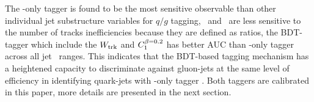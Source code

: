 
The \ntrk-only tagger is found to be the most sensitive observable than other individual jet substructure variables for $q/g$ tagging, 
\wtrk~and \cbeta~are less sensitive to the number of tracks inefficiencies because they are defined as ratios, the BDT-tagger which include the $W_{\mathrm{trk}}$ and $C_{1}^{\beta=0.2}$ has better AUC than \ntrk-only tagger across all jet \pt~ranges. This indicates that the BDT-based tagging mechanism has a heightened capacity to discriminate against gluon-jets at the same level of efficiency in identifying quark-jets with \ntrk-only tagger . Both taggers are calibrated in this paper, more details are presented in the next section.



\FloatBarrier


